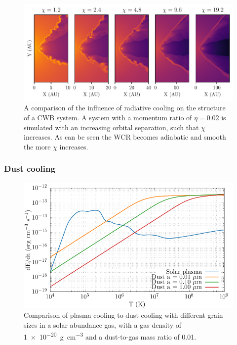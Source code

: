 \begin{figure}[h]
  \centering
  \includegraphics{assets/cwb-structure/ch1-chi-rho.pdf}
  \caption{A comparison of the influence of radiative cooling on the structure of a CWB system. A system with a momentum ratio of $\eta = 0.02$ is simulated with an increasing orbital separation, such that $\chi$ increases. As can be seen the WCR becomes adiabatic and smooth the more $\chi$ increases.}
  \label{fig:chicomparison}
\end{figure}

\subsubsection{Dust cooling}
\label{sec:dustcooling-background}

\begin{figure}[h]
  \centering
  \includegraphics{assets/dust-plasma-cooling-comparison/cooling-comparison.pdf}
  \caption[Dust cooling vs. plasma cooling]{Comparison of plasma cooling to dust cooling with different grain sizes in a solar abundance gas, with a gas density of \SI{1e-20}{\gram\per\centi\metre\cubed} and a dust-to-gas mass ratio of 0.01.}
  \label{fig:dustplasmacomparison}
\end{figure}

